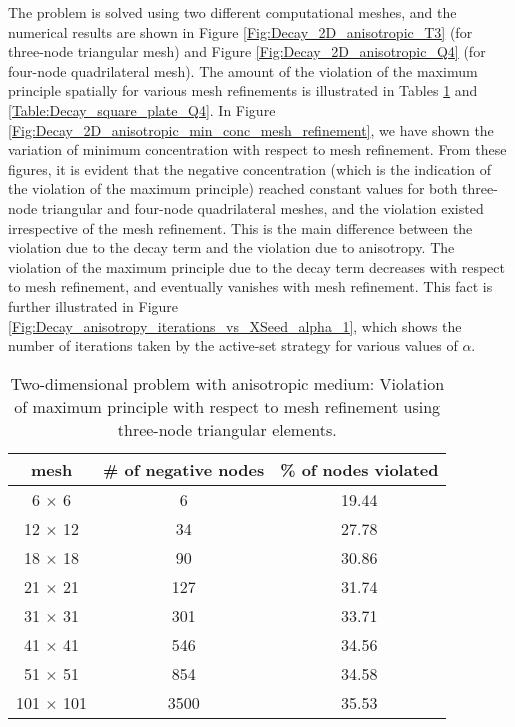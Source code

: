 \documentclass[11pt]{amsart}
\begin{document}
The problem is solved using two different computational meshes, and the numerical results 
are shown in Figure \ref{Fig:Decay_2D_anisotropic_T3} (for three-node triangular mesh) 
and Figure \ref{Fig:Decay_2D_anisotropic_Q4} (for four-node quadrilateral mesh). 
The amount of the violation of the maximum principle spatially for various mesh 
refinements is illustrated in Tables \ref{Table:Decay_square_plate_T3} and 
\ref{Table:Decay_square_plate_Q4}. 
In Figure \ref{Fig:Decay_2D_anisotropic_min_conc_mesh_refinement}, we have 
shown the variation of minimum concentration with respect to mesh refinement. From 
these figures, it is evident that the negative concentration (which is the indication 
of the violation of the maximum principle) reached constant values for both 
three-node triangular and four-node quadrilateral meshes, and the violation 
existed irrespective of the mesh refinement.
This is the main difference between the violation due to the decay term and the violation 
due to anisotropy. The violation of the maximum principle due to the decay term decreases 
with respect to mesh refinement, and eventually vanishes with mesh refinement. This fact is 
further illustrated in Figure \ref{Fig:Decay_anisotropy_iterations_vs_XSeed_alpha_1}, which 
shows the number of iterations taken by the active-set strategy for various values of $\alpha$. 

\begin{table}[t]
  \centering
  \caption{Two-dimensional problem with anisotropic medium: Violation of maximum 
    principle with respect to mesh refinement using three-node triangular elements. 
    \label{Table:Decay_square_plate_T3}}
  \begin{tabular}{|c|c|c|} \hline
    \textbf{mesh} & \textbf{\# of negative nodes} & \textbf{\% of nodes violated} \\ \hline
    6 $\times$ 6   & 6 & 19.44                \\ \hline
    12 $\times$ 12  & 34 & 27.78          \\ \hline
    18 $\times$ 18  & 90 & 30.86          \\ \hline
    21 $\times$ 21  & 127 & 31.74        \\ \hline
    31 $\times$ 31  & 301 & 33.71        \\ \hline
    41 $\times$ 41  & 546 & 34.56        \\ \hline
    51 $\times$ 51  & 854 & 34.58        \\ \hline
    101 $\times$ 101 & 3500 & 35.53  \\ \hline
  \end{tabular}
\end{table}
\end{document}
